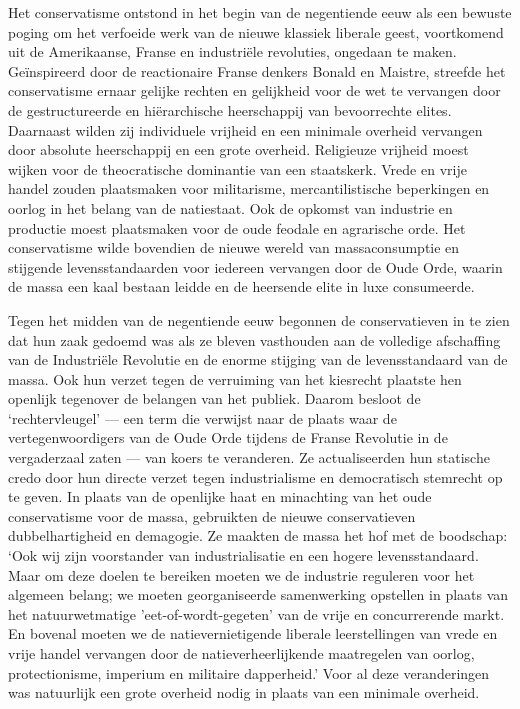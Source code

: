 \documentclass[
  a5paper,
  smalldemyvopaper,10pt,twoside,onecolumn,openright,extrafontsizes,hidelinks]{memoir}
\begin{document}
Het conservatisme ontstond in het begin van de negentiende eeuw als een
bewuste poging om het verfoeide werk van de nieuwe klassiek liberale
geest, voortkomend uit de Amerikaanse, Franse en industriële revoluties,
ongedaan te maken. Geïnspireerd door de reactionaire Franse denkers
Bonald en Maistre, streefde het conservatisme ernaar gelijke rechten en
gelijkheid voor de wet te vervangen door de gestructureerde en
hiërarchische heerschappij van bevoorrechte elites. Daarnaast wilden zij
individuele vrijheid en een minimale overheid vervangen door absolute
heerschappij en een grote overheid. Religieuze vrijheid moest wijken
voor de theocratische dominantie van een staatskerk. Vrede en vrije
handel zouden plaatsmaken voor militarisme, mercantilistische
beperkingen en oorlog in het belang van de natiestaat. Ook de opkomst
van industrie en productie moest plaatsmaken voor de oude feodale en
agrarische orde. Het conservatisme wilde bovendien de nieuwe wereld van
massaconsumptie en stijgende levensstandaarden voor iedereen vervangen
door de Oude Orde, waarin de massa een kaal bestaan leidde en de
heersende elite in luxe consumeerde.

Tegen het midden van de negentiende eeuw begonnen de conservatieven in
te zien dat hun zaak gedoemd was als ze bleven vasthouden aan de
volledige afschaffing van de Industriële Revolutie en de enorme stijging
van de levensstandaard van de massa. Ook hun verzet tegen de verruiming
van het kiesrecht plaatste hen openlijk tegenover de belangen van het
publiek. Daarom besloot de `rechtervleugel' --- een term die verwijst
naar de plaats waar de vertegenwoordigers van de Oude Orde tijdens de
Franse Revolutie in de vergaderzaal zaten --- van koers te veranderen.
Ze actualiseerden hun statische credo door hun directe verzet tegen
industrialisme en democratisch stemrecht op te geven. In plaats van de
openlijke haat en minachting van het oude conservatisme voor de massa,
gebruikten de nieuwe conservatieven dubbelhartigheid en demagogie. Ze
maakten de massa het hof met de boodschap: `Ook wij zijn voorstander van
industrialisatie en een hogere levensstandaard. Maar om deze doelen te
bereiken moeten we de industrie reguleren voor het algemeen belang; we
moeten georganiseerde samenwerking opstellen in plaats van het
natuurwetmatige 'eet-of-wordt-gegeten' van de vrije en concurrerende
markt. En bovenal moeten we de natievernietigende liberale
leerstellingen van vrede en vrije handel vervangen door de
natieverheerlijkende maatregelen van oorlog, protectionisme, imperium en
militaire dapperheid.' Voor al deze veranderingen was natuurlijk een
grote overheid nodig in plaats van een minimale overheid.
\end{document}
